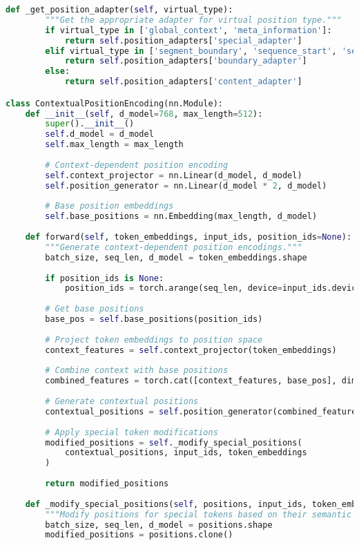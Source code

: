 \begin{lstlisting}[language=Python, caption=Learned position embeddings with special token support]
    def _get_position_adapter(self, virtual_type):
        """Get the appropriate adapter for virtual position type."""
        if virtual_type in ['global_context', 'meta_information']:
            return self.position_adapters['special_adapter']
        elif virtual_type in ['segment_boundary', 'sequence_start', 'sequence_end']:
            return self.position_adapters['boundary_adapter']
        else:
            return self.position_adapters['content_adapter']

class ContextualPositionEncoding(nn.Module):
    def __init__(self, d_model=768, max_length=512):
        super().__init__()
        self.d_model = d_model
        self.max_length = max_length
        
        # Context-dependent position encoding
        self.context_projector = nn.Linear(d_model, d_model)
        self.position_generator = nn.Linear(d_model * 2, d_model)
        
        # Base position embeddings
        self.base_positions = nn.Embedding(max_length, d_model)
        
    def forward(self, token_embeddings, input_ids, position_ids=None):
        """Generate context-dependent position encodings."""
        batch_size, seq_len, d_model = token_embeddings.shape
        
        if position_ids is None:
            position_ids = torch.arange(seq_len, device=input_ids.device).expand(batch_size, -1)
            
        # Get base positions
        base_pos = self.base_positions(position_ids)
        
        # Project token embeddings to position space
        context_features = self.context_projector(token_embeddings)
        
        # Combine context with base positions
        combined_features = torch.cat([context_features, base_pos], dim=-1)
        
        # Generate contextual positions
        contextual_positions = self.position_generator(combined_features)
        
        # Apply special token modifications
        modified_positions = self._modify_special_positions(
            contextual_positions, input_ids, token_embeddings
        )
        
        return modified_positions
        
    def _modify_special_positions(self, positions, input_ids, token_embeddings):
        """Modify positions for special tokens based on their semantic role."""
        batch_size, seq_len, d_model = positions.shape
        modified_positions = positions.clone()
        

\end{lstlisting}
